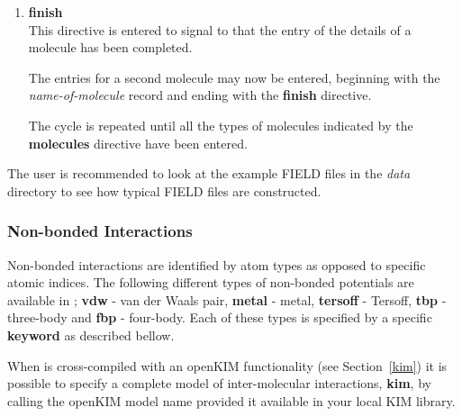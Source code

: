 \begin{enumerate}
\item {\bf finish} \\
This directive is entered to signal to \D that the entry of the
details of a molecule has been completed.

The entries for a second molecule may now be entered, beginning with
the {\em name-of-molecule} record and ending with the {\bf finish}
directive.

The cycle is repeated until all the types of molecules indicated by
the {\bf molecules} directive have been entered.

\end{enumerate}

The user is recommended to look at the example FIELD files in the {\em
data} directory to see how typical FIELD files are constructed.

\subsubsection*{Non-bonded Interactions}

Non-bonded interactions are identified by atom types as opposed to
specific atomic indices.  The following different types of
non-bonded potentials are available in
\D; {\bf vdw} - van der Waals pair,
{\bf metal} - metal, {\bf tersoff} -
Tersoff, {\bf tbp} -
three-body and {\bf fbp} -
four-body.  Each of these types is
specified by a specific {\bf keyword} as described bellow.

When \D is cross-compiled with an openKIM functionality (see
Section~\ref{kim}) it is possible to specify a complete model of
inter-molecular interactions, {\bf kim}, by calling the openKIM
model name provided it available in your local KIM library.

